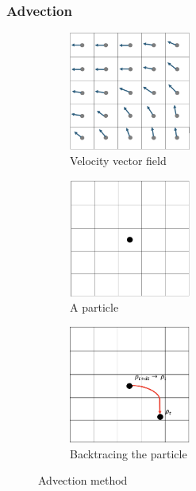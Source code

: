 \documentclass[a4paper,12pt,titlepage]{article}
\begin{document}
\subsubsection{Advection}

\begin{figure}[H]
	\centering
	\begin{subfigure}{0.3\textwidth}
		\centering
		\includegraphics[width=4cm]{resources/advection1.png}
		\caption{Velocity vector field}
	\end{subfigure}
	\begin{subfigure}{0.3\textwidth}
		\centering
		\includegraphics[width=4cm]{resources/advection2.png}
		\caption{A particle}
	\end{subfigure}
	\begin{subfigure}{0.3\textwidth}
		\centering
		\includegraphics[width=4cm]{resources/advection3.png}
		\caption{Backtracing the particle}
	\end{subfigure}
	\caption {Advection method}
	\label{fig:advection}
\end{figure}
\end{document}

